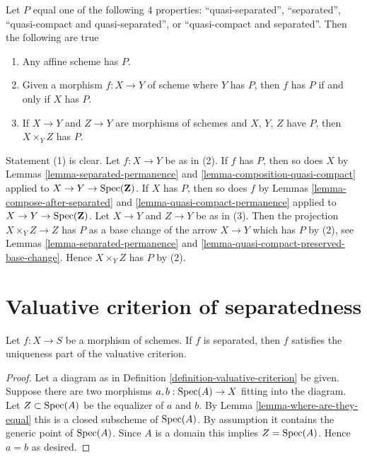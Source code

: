 \begin{remark}
\label{remark-quasi-compact-and-quasi-separated}
Let $P$ equal one of the following $4$ properties:
``quasi-separated'', ``separated'',
``quasi-compact and quasi-separated'', or ``quasi-compact and separated''.
Then the following are true
\begin{enumerate}
\item Any affine scheme has $P$.
\item Given a morphism $f : X \to Y$ of scheme where $Y$ has $P$, then
$f$ has $P$ if and only if $X$ has $P$.
\item If  $X \to Y$ and $Z \to Y$ are morphisms of schemes
and $X$, $Y$, $Z$ have $P$, then $X \times_Y Z$ has $P$.
\end{enumerate}
Statement (1) is clear.
Let $f : X \to Y$ be as in (2). If $f$ has $P$, then so does $X$
by Lemmas \ref{lemma-separated-permanence} and
\ref{lemma-composition-quasi-compact} applied to
$X \to Y \to \mathop{\mathrm{Spec}}(\mathbf{Z})$. If $X$ has $P$, then so does $f$ by
Lemmas \ref{lemma-compose-after-separated} and
\ref{lemma-quasi-compact-permanence} applied to
$X \to Y \to \mathop{\mathrm{Spec}}(\mathbf{Z})$.
Let $X \to Y$ and $Z \to Y$ be as in (3).
Then the projection $X \times_Y Z \to Z$ has $P$ as a base change of
the arrow $X \to Y$ which has $P$ by (2), see Lemmas
\ref{lemma-separated-permanence} and
\ref{lemma-quasi-compact-preserved-base-change}.
Hence $X \times_Y Z$ has $P$ by (2).
\end{remark}





\section{Valuative criterion of separatedness}
\label{section-valuative-separatedness}

\begin{lemma}
\label{lemma-separated-implies-valuative}
Let $f : X \to S$ be a morphism of schemes.
If $f$ is separated, then $f$ satisfies the uniqueness
part of the valuative criterion.
\end{lemma}

\begin{proof}
Let a diagram as in Definition \ref{definition-valuative-criterion}
be given. Suppose there are two morphisms
$a, b : \mathop{\mathrm{Spec}}(A) \to X$ fitting into the diagram.
Let $Z \subset \mathop{\mathrm{Spec}}(A)$ be the equalizer of $a$ and $b$.
By Lemma \ref{lemma-where-are-they-equal} this is a closed
subscheme of $\mathop{\mathrm{Spec}}(A)$. By assumption it contains
the generic point of $\mathop{\mathrm{Spec}}(A)$. Since $A$ is a domain
this implies $Z = \mathop{\mathrm{Spec}}(A)$. Hence $a = b$ as desired.
\end{proof}

